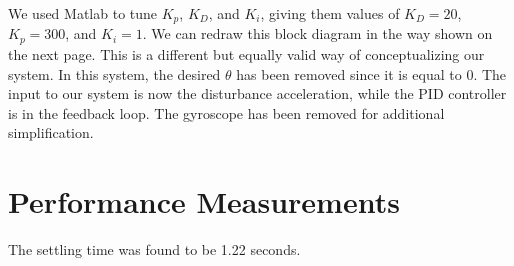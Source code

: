 \documentclass{notes}
\begin{document}
We used Matlab to tune $K_p$, $K_D$, and $K_i$, giving them values of $K_D=20$, $K_p=300$, and $K_i=1$.
We can redraw this block diagram in the way shown on the next page. This is a different but equally valid  way of conceptualizing our system. In this system, the desired $\theta$ has been removed since it is equal to 0. The input to our system is now the disturbance acceleration, while  the PID controller is in the feedback loop. The gyroscope has been removed for additional simplification.

\newpage
\section{Performance Measurements}
The settling time was found to be 1.22 seconds. 
\end{document}
